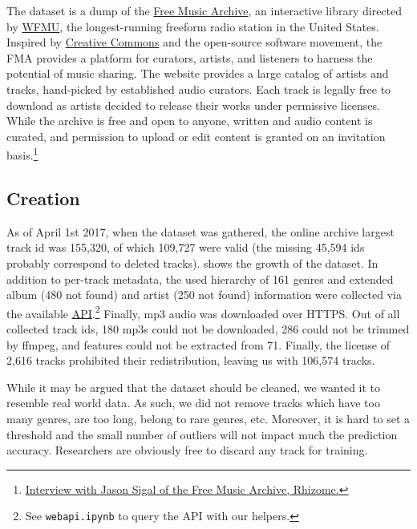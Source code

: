 \documentclass{article}
\newcommand{\ntracks}{106,574 }
\begin{document}
The dataset is a dump of the \href{https://freemusicarchive.org/}{Free Music Archive}, an interactive library directed by \href{https://wfmu.org/}{WFMU}, the longest-running freeform radio station in the United States.
Inspired by \href{https://creativecommons.org/}{Creative Commons} and the open-source software movement, the FMA provides a platform for curators, artists, and listeners to harness the potential of music sharing.
The website provides a large catalog of artists and tracks, hand-picked by established audio curators. Each track is legally free to download as artists decided to release their works under permissive licenses.
While the archive is free and open to anyone, written and audio content is curated, and permission to upload or edit content is granted on an invitation basis.\footnote{\href{http://rhizome.org/editorial/2009/may/1/interview-with-jason-sigal-of-the-free-music-archi}{Interview with Jason Sigal of the Free Music Archive, Rhizome.}}

\subsection{Creation} %

As of April 1st 2017, when the dataset was gathered, the online archive largest track id was 155,320, of which 109,727 were valid (the missing 45,594 ids probably correspond to deleted tracks).  shows the growth of the dataset. In addition to per-track metadata, the used hierarchy of 161 genres and extended album (480 not found) and artist (250 not found) information were collected via the available \href{https://freemusicarchive.org/api}{API}.\footnote{See \texttt{webapi.ipynb} to query the API with our helpers.} Finally, mp3 audio was downloaded over HTTPS.
Out of all collected track ids, 180 mp3s could not be downloaded, 286 could not be trimmed by ffmpeg, and features could not be extracted from 71. Finally, the license of 2,616 tracks prohibited their redistribution, leaving us with \ntracks tracks.

While it may be argued that the dataset should be cleaned, we wanted it to resemble real world data. As such, we did not remove tracks which have too many genres, are too long, belong to rare genres, etc. Moreover, it is hard to set a threshold and the small number of outliers will not impact much the prediction accuracy. Researchers are obviously free to discard any track for training.
\end{document}
